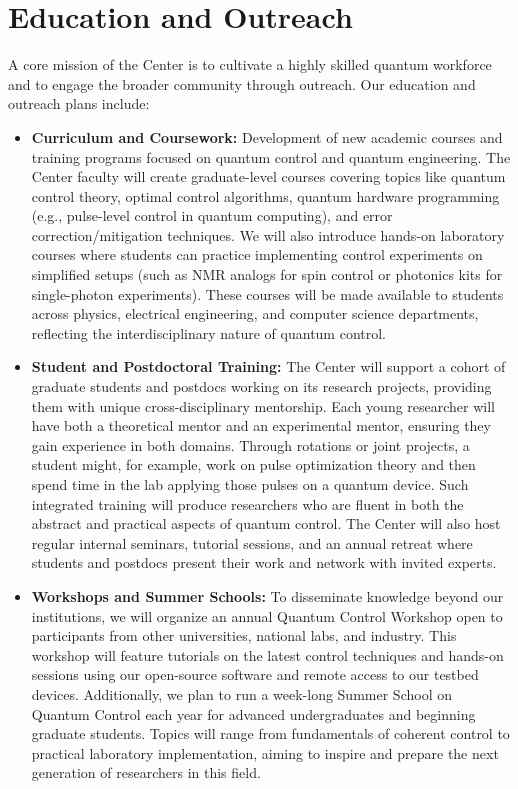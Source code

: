 \documentclass[11pt]{article}
\begin{document}
\section{Education and Outreach}
A core mission of the Center is to cultivate a highly skilled quantum workforce and to engage the broader community through outreach. Our education and outreach plans include:
\begin{itemize}
   \item \textbf{Curriculum and Coursework:} Development of new academic courses and training programs focused on quantum control and quantum engineering. The Center faculty will create graduate-level courses covering topics like quantum control theory, optimal control algorithms, quantum hardware programming (e.g., pulse-level control in quantum computing), and error correction/mitigation techniques. We will also introduce hands-on laboratory courses where students can practice implementing control experiments on simplified setups (such as NMR analogs for spin control or photonics kits for single-photon experiments). These courses will be made available to students across physics, electrical engineering, and computer science departments, reflecting the interdisciplinary nature of quantum control.
   \item \textbf{Student and Postdoctoral Training:} The Center will support a cohort of graduate students and postdocs working on its research projects, providing them with unique cross-disciplinary mentorship. Each young researcher will have both a theoretical mentor and an experimental mentor, ensuring they gain experience in both domains. Through rotations or joint projects, a student might, for example, work on pulse optimization theory and then spend time in the lab applying those pulses on a quantum device. Such integrated training will produce researchers who are fluent in both the abstract and practical aspects of quantum control. The Center will also host regular internal seminars, tutorial sessions, and an annual retreat where students and postdocs present their work and network with invited experts.
   \item \textbf{Workshops and Summer Schools:} To disseminate knowledge beyond our institutions, we will organize an annual Quantum Control Workshop open to participants from other universities, national labs, and industry. This workshop will feature tutorials on the latest control techniques and hands-on sessions using our open-source software and remote access to our testbed devices. Additionally, we plan to run a week-long Summer School on Quantum Control each year for advanced undergraduates and beginning graduate students. Topics will range from fundamentals of coherent control to practical laboratory implementation, aiming to inspire and prepare the next generation of researchers in this field.

\end{itemize}
\end{document}
